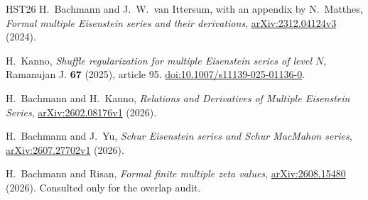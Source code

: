 \documentclass[12pt]{amsart}
\theoremstyle{definition}
\theoremstyle{remark}
\numberwithin{equation}{section}
\numberwithin{equation}{section}
\begin{document}
\begin{thebibliography}{HST26}
H.~Bachmann and J.~W.~van Ittersum, with an appendix by N.~Matthes,
\emph{Formal multiple Eisenstein series and their derivations},
\href{https://arxiv.org/abs/2312.04124}{arXiv:2312.04124v3} (2024).

H.~Kanno, \emph{Shuffle regularization for multiple Eisenstein series of level $N$},
Ramanujan J. \textbf{67} (2025), article 95.
\href{https://doi.org/10.1007/s11139-025-01136-0}{doi:10.1007/s11139-025-01136-0}.

H.~Bachmann and H.~Kanno,
\emph{Relations and Derivatives of Multiple Eisenstein Series},
\href{https://arxiv.org/abs/2602.08176}{arXiv:2602.08176v1} (2026).

H.~Bachmann and J.~Yu,
\emph{Schur Eisenstein series and Schur MacMahon series},
\href{https://arxiv.org/abs/2607.27702}{arXiv:2607.27702v1} (2026).

H.~Bachmann and Risan,
\emph{Formal finite multiple zeta values},
\href{https://arxiv.org/abs/2608.15480}{arXiv:2608.15480} (2026).
Consulted only for the overlap audit.
\end{thebibliography}
\end{document}
